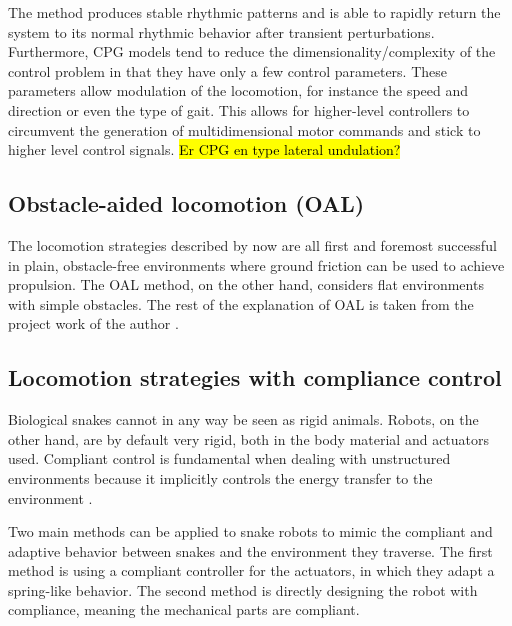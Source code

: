 The method produces stable rhythmic patterns and is able to rapidly return the system to its normal rhythmic behavior after transient perturbations. Furthermore, CPG models tend to reduce the dimensionality/complexity of the control problem in that they have only a few control parameters. These parameters allow modulation of the locomotion, for instance the speed and direction or even the type of gait. This allows for higher-level controllers to circumvent the generation of multidimensional motor commands and stick to higher level control signals.
\hl{Er CPG en type lateral undulation?}

\subsection{Obstacle-aided locomotion (OAL)}\label{subsec:OAL}

The locomotion strategies described by now are all first and foremost successful in plain, obstacle-free environments where ground friction can be used to achieve propulsion. The OAL method, on the other hand, considers flat environments with simple obstacles. The rest of the explanation of OAL is taken from the project work of the author \cite{AtussaProsjektoppgp}.





\subsection{Locomotion strategies with compliance control}\label{subsec:compliance-control}

Biological snakes cannot in any way be seen as rigid animals. Robots, on the other hand, are by default very rigid, both in the body material and actuators used.
Compliant control is fundamental when dealing with unstructured environments because it implicitly controls the energy transfer to the environment \cite{calanca2015review}.

Two main methods can be applied to snake robots to mimic the compliant and adaptive behavior between snakes and the environment they traverse. The first method is using a compliant controller for the actuators, in which they adapt a spring-like behavior. The second method is directly designing the robot with compliance, meaning the mechanical parts are compliant.

